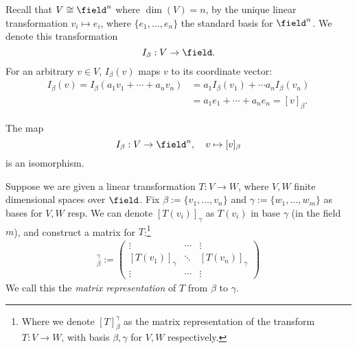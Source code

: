 \begin{remark}
    Recall that $V \cong \field^n$ where $\dim(V) = n$, by the unique linear transformation $v_i \mapsto e_i$, where $\{e_1, \dots, e_n\}$ the standard basis for $\field^n$. We denote this transformation $$I_\beta : V \to \field.$$ For an arbitrary $v \in V$, $I_\beta (v)$ maps $v$ to its coordinate vector:
    \begin{align}
        I_\beta(v) = I_\beta(a_1v_1  + \cdots + a_n v_n) &= a_1 I_\beta(v_1) + \cdots a_n I_\beta(v_n)\\
        &= a_1 e_1 + \cdots + a_n e_n = [v]_\beta.
    \end{align}
\end{remark}

\begin{proposition}
The map $$I_\beta : V \to \field^n, \quad v \mapsto [v]_\beta$$ is an isomorphism.
\end{proposition}

Suppose we are given a linear transformation $T : V \to W$, where $V, W$ finite dimensional spaces over $\field$. Fix $\beta := \{v_1, \dots, v_n\}$ and $\gamma := \{w_1, \dots, w_m\}$ as bases for $V, W$ resp. We can denote $[T(v_i)]_\gamma$ as $T(v_i)$ in base $\gamma$ (in the field $m$), and construct a matrix for $T$:\footnote{Where we denote $[T]_\beta^\gamma$ as the matrix representation of the transform $T: V \to W$, with basis $\beta, \gamma$ for $V, W$ respectively.}
\begin{align*}
    [T]_\beta^\gamma := \begin{pmatrix}
        \vdots & \cdots & \vdots\\
        [T(v_1)]_\gamma & \ddots & [T(v_n)]_\gamma\\
        \vdots & \cdots & \vdots
    \end{pmatrix}
\end{align*}
We call this the \emph{matrix representation} of $T$ from $\beta$ to $\gamma$.

